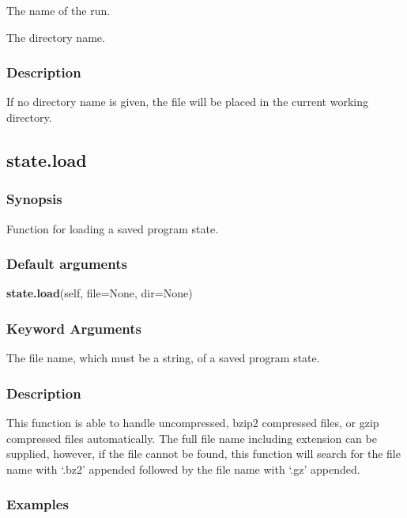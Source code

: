   The name of the run.

  The directory name.


\subsubsection{Description}

If no directory name is given, the file will be placed in the current working directory.


\newpage

\subsection{state.load}


\subsubsection{Synopsis}

Function for loading a saved program state.

\subsubsection{Default arguments}

\textsf{\textbf{state.load}(self, file=None, dir=None)}


\subsubsection{Keyword Arguments}

  The file name, which must be a string, of a saved program state.


\subsubsection{Description}

This function is able to handle uncompressed, bzip2 compressed files, or gzip compressed
files automatically.  The full file name including extension can be supplied, however, if
the file cannot be found, this function will search for the file name with `.bz2' appended
followed by the file name with `.gz' appended.


\subsubsection{Examples}

